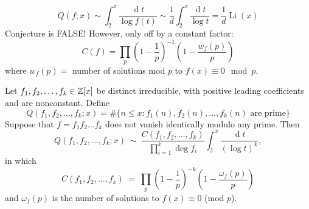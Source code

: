 \documentclass[12pt]{article}
\renewcommand{\d}{\ensuremath{\operatorname{d}}}
\begin{document}
\conjecture \[Q(f;x) \sim \int_{2}^{x}\frac{\d t}{\log f(t)} \sim\frac{1}{d}\int_{2}^{x}\frac{\d t}{\log t} = \frac{1}{d} \operatorname{Li}(x)\]
\rmk Conjecture is FALSE! However, only off by a constant factor: \[C(f) = \prod_p \left(1-\frac{1}{p}\right)^{-1}\left(1-\frac{w_f(p)}{p}\right)\]
where $w_f(p) = $ number of solutions mod $p$ to $f(x)\equiv 0\mod p$.

 Let $f_1,f_2,\dots,f_k\in \mathbb{Z}[x]$ be distinct irreducible, with positive leading coefficients and are nonconstant. Define 
$$Q(f_{1},f_{2},\ldots,f_{k};x)=\#\{n\leq x:f_{1}(n),f_{2}(n),\ldots,f_{k}(n)\text{ are prime}\}$$
Suppose that $f = f_1f_2\dots f_k$ does not vanish identically modulo any prime. Then
$$Q(f_{1},f_{2},\ldots,f_{k};x)\ \sim\ \frac{C(f_{1},f_{2},\ldots,f_{k})}{\prod_{i=1}^{k}\deg f_{i}}\int_{2}^{x}\frac{\d t}{(\log t)^{k}},$$
in which
$$C(f_{1},f_{2},\ldots,f_{k})\ =\ \prod_{p}\left(1-\frac{1}{p}\right)^{-k}\left(1-\frac{\omega_{f}(p)}{p}\right)$$
and $\omega_{f}(p)$ is the number of solutions to $f(x)\equiv0$ (mod $p$).
\end{document}
